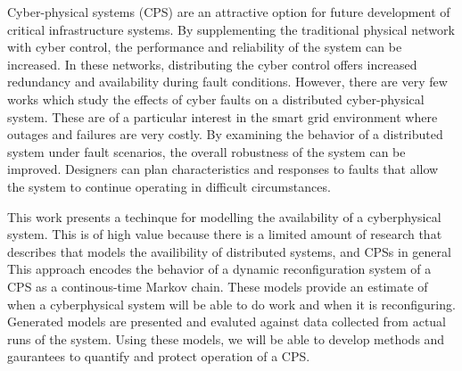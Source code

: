 Cyber-physical systems (CPS) are an attractive option for future development of critical infrastructure systems.
By supplementing the traditional physical network with cyber control, the performance and reliability of the system can be increased.
In these networks, distributing the cyber control offers increased redundancy and availability during fault conditions.
However, there are very few works which study the effects of cyber faults on a  distributed cyber-physical system.
These are of a particular interest in the smart grid environment where outages and failures are very costly.
By examining the behavior of a distributed system under fault scenarios, the overall robustness of the system can be improved.
Designers can plan characteristics and responses to faults that allow the system to continue operating in difficult circumstances.

This work presents a techinque for modelling the availability of a cyberphysical system.
This is of high value because there is a limited amount of research that describes that models the availibility of distributed systems, and CPSs in general
This approach encodes the behavior of a dynamic reconfiguration system of a CPS as a continous-time Markov chain.
These models provide an estimate of when a cyberphysical system will be able to do work and when it is reconfiguring.
Generated models are presented and evaluted against data collected from actual runs of the system.
Using these models, we will be able to develop methods and gaurantees to quantify and protect operation of a CPS.
